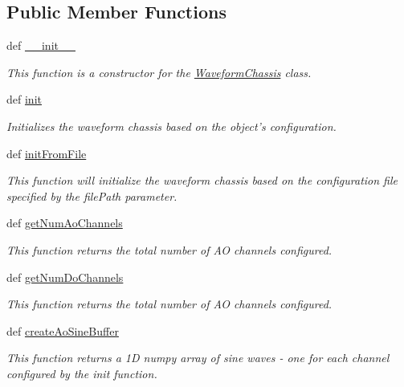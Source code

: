 \subsection*{Public Member Functions}
\begin{DoxyCompactItemize}
\item 
def \hyperlink{class_waveform_chassis_1_1_waveform_chassis_a5b9740879596dbe1422d47dacfaf5f6a}{\-\_\-\-\_\-init\-\_\-\-\_\-}
\begin{DoxyCompactList}\small\item\em This function is a constructor for the \hyperlink{class_waveform_chassis_1_1_waveform_chassis}{Waveform\-Chassis} class. \end{DoxyCompactList}\item 
def \hyperlink{class_waveform_chassis_1_1_waveform_chassis_acd9ab0cb2573d71efcdbf86fb731a95c}{init}
\begin{DoxyCompactList}\small\item\em Initializes the waveform chassis based on the object's configuration. \end{DoxyCompactList}\item 
def \hyperlink{class_waveform_chassis_1_1_waveform_chassis_a81d7ac137a7779ca0dd6ef8492c6030a}{init\-From\-File}
\begin{DoxyCompactList}\small\item\em This function will initialize the waveform chassis based on the configuration file specified by the file\-Path parameter. \end{DoxyCompactList}\item 
def \hyperlink{class_waveform_chassis_1_1_waveform_chassis_a6fee2bcdaeebeda998be000c1892516e}{get\-Num\-Ao\-Channels}
\begin{DoxyCompactList}\small\item\em This function returns the total number of A\-O channels configured. \end{DoxyCompactList}\item 
def \hyperlink{class_waveform_chassis_1_1_waveform_chassis_aa22034c8b518ce28bdf7bcf9f26925ec}{get\-Num\-Do\-Channels}
\begin{DoxyCompactList}\small\item\em This function returns the total number of A\-O channels configured. \end{DoxyCompactList}\item 
def \hyperlink{class_waveform_chassis_1_1_waveform_chassis_a744d35788b29af622f30aa20bb2510b0}{create\-Ao\-Sine\-Buffer}
\begin{DoxyCompactList}\small\item\em This function returns a 1\-D numpy array of sine waves -\/ one for each channel configured by the init function. \end{DoxyCompactList}\item 

\end{DoxyCompactItemize}
